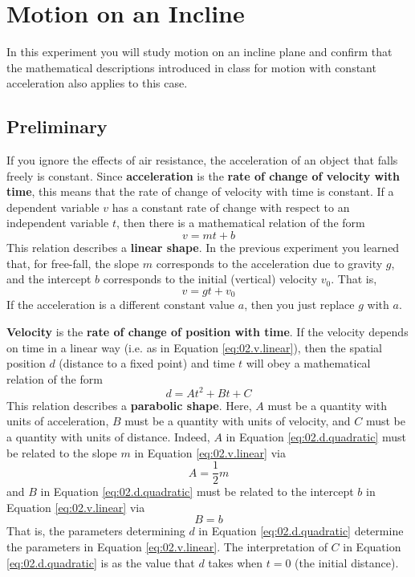 \chapter{Motion on an Incline}
%
In this experiment you will study motion on an incline plane and confirm that the mathematical descriptions introduced in class for motion with constant acceleration also applies to this case.
%
\section{Preliminary}
%
If you ignore the effects of air resistance, the acceleration of an object that falls freely is constant. Since \textbf{acceleration} is the \textbf{rate of change of velocity with time}, this means that the rate of change of velocity with time is constant. If a dependent variable $v$ has a constant rate of change with respect to an independent variable $t$, then there is a mathematical relation of the form
\begin{equation}
    v = m t + b
    \label{eq:02.v.linear}
\end{equation}
This relation describes a \textbf{linear shape}. In the previous experiment you learned that, for free-fall, the slope $m$ corresponds to the acceleration due to gravity $g$, and the intercept $b$ corresponds to the initial (vertical) velocity $v_{0}$. That is,
\begin{equation}
    v = g t + v_{0}
\end{equation}
If the acceleration is a different constant value $a$, then you just replace $g$ with $a$.

\textbf{Velocity} is the \textbf{rate of change of position with time}. If the velocity depends on time in a linear way (i.e. as in Equation \ref{eq:02.v.linear}), then the spatial position $d$ (distance to a fixed point) and time $t$ will obey a mathematical relation of the form
\begin{equation}
    d = A t^{2} + B t + C
    \label{eq:02.d.quadratic}
\end{equation}
This relation describes a \textbf{parabolic shape}. Here, $A$ must be a quantity with units of acceleration, $B$ must be a quantity with units of velocity, and $C$ must be a quantity with units of distance. Indeed, $A$ in Equation \ref{eq:02.d.quadratic} must be related to the slope $m$ in Equation \ref{eq:02.v.linear} via
\begin{equation}
    A = \frac{1}{2} m
\end{equation}
and $B$ in Equation \ref{eq:02.d.quadratic} must be related to the intercept $b$ in Equation \ref{eq:02.v.linear} via
\begin{equation}
    B = b
\end{equation}
That is, the parameters determining $d$ in Equation \ref{eq:02.d.quadratic} determine the parameters in Equation \ref{eq:02.v.linear}. The interpretation of $C$ in Equation \ref{eq:02.d.quadratic} is as the value that $d$ takes when $t = 0$ (the initial distance).

